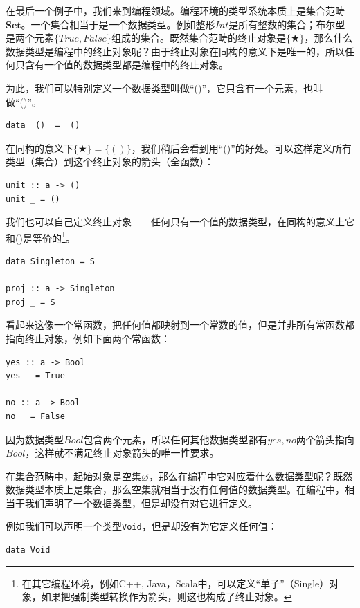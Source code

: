 \documentclass[b5paper]{ctexart}
\begin{document}
\begin{example}
在最后一个例子中，我们来到编程领域。编程环境的类型系统本质上是集合范畴$\pmb{Set}$。一个集合相当于是一个数据类型。例如整形$Int$是所有整数的集合；布尔型是两个元素$\{True, False\}$组成的集合。既然集合范畴的终止对象是$\{ \bigstar \}$，那么什么数据类型是编程中的终止对象呢？由于终止对象在同构的意义下是唯一的，所以任何只含有一个值的数据类型都是编程中的终止对象。

为此，我们可以特别定义一个数据类型叫做“()”，它只含有一个元素，也叫做“()”。

\begin{lstlisting}
data  ()  =  ()
\end{lstlisting}

在同构的意义下$\{ \bigstar \} = \{()\}$，我们稍后会看到用“()”的好处。可以这样定义所有类型（集合）到这个终止对象的箭头（全函数）：

\begin{lstlisting}
unit :: a -> ()
unit _ = ()
\end{lstlisting}

我们也可以自己定义终止对象——任何只有一个值的数据类型，在同构的意义上它和()是等价的\footnote{在其它编程环境，例如C++, Java，Scala中，可以定义“单子”（Single）对象，如果把强制类型转换作为箭头，则这也构成了终止对象。}。

\begin{lstlisting}
data Singleton = S

proj :: a -> Singleton
proj _ = S
\end{lstlisting}

看起来这像一个常函数，把任何值都映射到一个常数的值，但是并非所有常函数都指向终止对象，例如下面两个常函数：

\begin{lstlisting}
yes :: a -> Bool
yes _ = True

no :: a -> Bool
no _ = False
\end{lstlisting}

因为数据类型$Bool$包含两个元素，所以任何其他数据类型都有$yes, no$两个箭头指向$Bool$，这样就不满足终止对象箭头的唯一性要求。

在集合范畴中，起始对象是空集$\varnothing$，那么在编程中它对应着什么数据类型呢？既然数据类型本质上是集合，那么空集就相当于没有任何值的数据类型。在编程中，相当于我们声明了一个数据类型，但是却没有对它进行定义。

例如我们可以声明一个类型\texttt{Void}，但是却没有为它定义任何值：

\begin{lstlisting}
data Void
\end{lstlisting}


\end{example}
\end{document}
